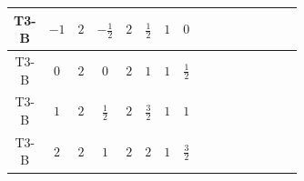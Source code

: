 \documentclass[8pt]{article}
\begin{document}
\begin{landscape}
\begin{longtable}{@{}cccccccc >{\raggedright\arraybackslash}p{0.21\linewidth} >{\raggedright\arraybackslash}p{0.21\linewidth} >{\raggedright\arraybackslash}p{0.21\linewidth}@{}}
T3-B & $-1$ & $2$ & $-\frac{1}{2}$ & $2$ & $\frac{1}{2}$ & $1$ & $0$ & \scriptsize\adjustbox{max width=\linewidth}{$\begin{gathered} +D_{\mu _1}\left(S_{2,j_1}\right){}^{\dagger } D_{\mu _1}\left(S_{2,j_1}\right)\end{gathered}$} & \scriptsize\adjustbox{max width=\linewidth}{$\begin{gathered} -\frac{1}{2} F_{r_1}{}^T\, C\, F_{r_1} M_F\end{gathered}$} & \scriptsize\adjustbox{max width=\linewidth}{$\begin{gathered} +\frac{1}{2} i F_{r_1}{}^T\, C\, \gamma ^{\mu _1}\, D_{\mu _1}\left(F_{r_1}\right)\end{gathered}$} \\
\midrule
T3-B & $0$ & $2$ & $0$ & $2$ & $1$ & $1$ & $\frac{1}{2}$ & \scriptsize\adjustbox{max width=\linewidth}{$\begin{gathered} +D_{\mu _1}\left(S_{2,j_1}\right){}^{\dagger } D_{\mu _1}\left(S_{2,j_1}\right)\end{gathered}$} & \scriptsize\adjustbox{max width=\linewidth}{$\begin{gathered} -\overline{F_{r_1}}\, F_{r_1} M_F\end{gathered}$} & \scriptsize\adjustbox{max width=\linewidth}{$\begin{gathered} +i \overline{F_{r_1}}\, \gamma ^{\mu _1}\, D_{\mu _1}\left(F_{r_1}\right)\end{gathered}$} \\
\midrule
T3-B & $1$ & $2$ & $\frac{1}{2}$ & $2$ & $\frac{3}{2}$ & $1$ & $1$ & \scriptsize\adjustbox{max width=\linewidth}{$\begin{gathered} +D_{\mu _1}\left(S_{2,j_1}\right){}^{\dagger } D_{\mu _1}\left(S_{2,j_1}\right)\end{gathered}$} & \scriptsize\adjustbox{max width=\linewidth}{$\begin{gathered} -\overline{F_{r_1}}\, F_{r_1} M_F\end{gathered}$} & \scriptsize\adjustbox{max width=\linewidth}{$\begin{gathered} +i \overline{F_{r_1}}\, \gamma ^{\mu _1}\, D_{\mu _1}\left(F_{r_1}\right)\end{gathered}$} \\
\midrule
T3-B & $2$ & $2$ & $1$ & $2$ & $2$ & $1$ & $\frac{3}{2}$ & \scriptsize\adjustbox{max width=\linewidth}{$\begin{gathered} +D_{\mu _1}\left(S_{2,j_1}\right){}^{\dagger } D_{\mu _1}\left(S_{2,j_1}\right)\end{gathered}$} & \scriptsize\adjustbox{max width=\linewidth}{$\begin{gathered} -\overline{F_{r_1}}\, F_{r_1} M_F\end{gathered}$} & \scriptsize\adjustbox{max width=\linewidth}{$\begin{gathered} +i \overline{F_{r_1}}\, \gamma ^{\mu _1}\, D_{\mu _1}\left(F_{r_1}\right)\end{gathered}$} \\

\end{longtable}
\end{landscape}
\end{document}
